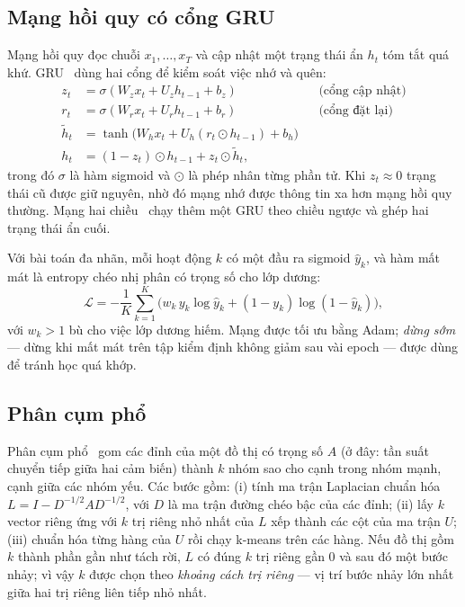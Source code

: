 \subsection{Mạng hồi quy có cổng GRU}
\label{sec:bg-gru}
Mạng hồi quy đọc chuỗi $x_1, \dots, x_T$ và cập nhật một trạng thái ẩn $h_t$ tóm tắt quá khứ. GRU~\cite{cho2014gru}
dùng hai cổng để kiểm soát việc nhớ và quên:
\begin{align}
  z_t &= \sigma(W_z x_t + U_z h_{t-1} + b_z) && \text{(cổng cập nhật)}\\
  r_t &= \sigma(W_r x_t + U_r h_{t-1} + b_r) && \text{(cổng đặt lại)}\\
  \tilde h_t &= \tanh\big(W_h x_t + U_h (r_t \odot h_{t-1}) + b_h\big)\\
  h_t &= (1 - z_t) \odot h_{t-1} + z_t \odot \tilde h_t ,
\end{align}
trong đó $\sigma$ là hàm sigmoid và $\odot$ là phép nhân từng phần tử. Khi $z_t \approx 0$ trạng thái cũ
được giữ nguyên, nhờ đó mạng nhớ được thông tin xa hơn mạng hồi quy thường. Mạng hai
chiều~\cite{schuster1997brnn} chạy thêm một GRU theo chiều ngược và ghép hai trạng thái ẩn cuối.

Với bài toán đa nhãn, mỗi hoạt động $k$ có một đầu ra sigmoid $\hat y_k$, và hàm mất mát là entropy chéo
nhị phân có trọng số cho lớp dương:
\begin{equation}
  \mathcal L = -\frac{1}{K}\sum_{k=1}^{K}\Big(w_k\, y_k \log \hat y_k + (1 - y_k)\log(1 - \hat y_k)\Big),
  \label{eq:bce}
\end{equation}
với $w_k > 1$ bù cho việc lớp dương hiếm. Mạng được tối ưu bằng Adam; \emph{dừng sớm} --- dừng khi mất mát
trên tập kiểm định không giảm sau vài epoch --- được dùng để tránh học quá khớp.

\subsection{Phân cụm phổ}
\label{sec:bg-spectral}
Phân cụm phổ~\cite{vonluxburg2007spectral} gom các đỉnh của một đồ thị có trọng số $A$ (ở đây: tần suất
chuyển tiếp giữa hai cảm biến) thành $k$ nhóm sao cho cạnh trong nhóm mạnh, cạnh giữa các nhóm yếu. Các
bước gồm: (i) tính ma trận Laplacian chuẩn hóa $L = I - D^{-1/2} A D^{-1/2}$, với $D$ là ma trận đường chéo
bậc của các đỉnh; (ii) lấy $k$ vector riêng ứng với $k$ trị riêng nhỏ nhất của $L$ xếp thành các cột của
ma trận $U$; (iii) chuẩn hóa từng hàng của $U$ rồi chạy k-means trên các hàng. Nếu đồ thị gồm $k$ thành phần
gần như tách rời, $L$ có đúng $k$ trị riêng gần 0 và sau đó một bước nhảy; vì vậy $k$ được chọn theo
\emph{khoảng cách trị riêng} --- vị trí bước nhảy lớn nhất giữa hai trị riêng liên tiếp nhỏ nhất.

